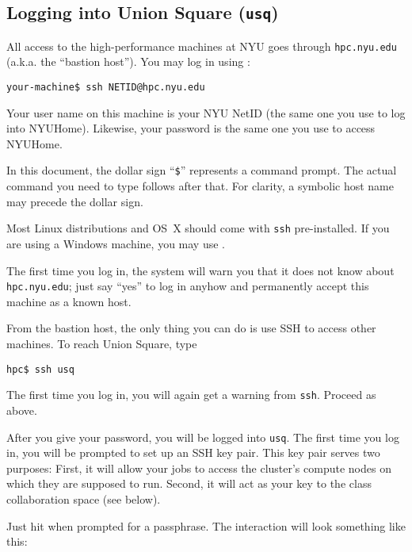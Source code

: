 \documentclass[11pt]{article}
\begin{document}
\subsection*{Logging into Union Square (\texttt{usq})}

All access to the high-performance machines at NYU goes through
\texttt{hpc.nyu.edu} (a.k.a. the ``bastion host''). You may log in using
:
\begin{lstlisting}
your-machine$ ssh NETID@hpc.nyu.edu
\end{lstlisting}
Your user name on this machine is your NYU NetID (the same one you use
to log into NYUHome). Likewise, your password is the same one you use
to access NYUHome.

\begin{note}
In this document, the dollar sign ``\texttt{\$}'' represents a
command prompt. The actual command you need to type follows after that. For
clarity, a symbolic host name may precede the dollar sign.
\end{note}

Most Linux distributions and OS~X should come with \texttt{ssh}
pre-installed.  If you are using a Windows machine, you may use
.

The first time you log in, the system will warn you that it does not
know about \texttt{hpc.nyu.edu}; just say ``yes'' to log in anyhow and
permanently accept this machine as a known host.

From the bastion host, the only thing you can do is use SSH to access other
machines. To reach Union Square, type 
\begin{lstlisting}
hpc$ ssh usq
\end{lstlisting}
The first time you log in, you will again get a warning from
\texttt{ssh}. Proceed as above.

After you give your password, you will be logged into \texttt{usq}.
The first time you log in, you will be prompted to set up an SSH key
pair.  This key pair serves two purposes: First, it will
allow your jobs to access the cluster's compute nodes on which they
are supposed to run. Second, it will act as your key to the class
collaboration space (see below).

Just hit \Enter when prompted for a passphrase. The interaction will
look something like this:
\end{document}
